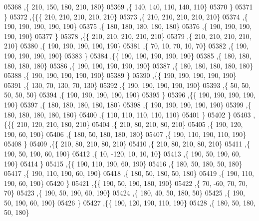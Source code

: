 \begin{DoxyCode}
05368     ,\{   210,   150,   180,   210,   180\}
05369     ,\{   140,   140,   110,   140,   110\}
05370     \}
05371    \}
05372   ,\{\{\{   210,   210,   210,   210,   210\}
05373     ,\{   210,   210,   210,   210,   210\}
05374     ,\{   190,   190,   190,   190,   190\}
05375     ,\{   180,   180,   180,   180,   180\}
05376     ,\{   190,   190,   190,   190,   190\}
05377     \}
05378    ,\{\{   210,   210,   210,   210,   210\}
05379     ,\{   210,   210,   210,   210,   210\}
05380     ,\{   190,   190,   190,   190,   190\}
05381     ,\{    70,    10,    70,    10,    70\}
05382     ,\{   190,   190,   190,   190,   190\}
05383     \}
05384    ,\{\{   190,   190,   190,   190,   190\}
05385     ,\{   180,   180,   180,   180,   180\}
05386     ,\{   190,   190,   190,   190,   190\}
05387     ,\{   180,   180,   180,   180,   180\}
05388     ,\{   190,   190,   190,   190,   190\}
05389     \}
05390    ,\{\{   190,   190,   190,   190,   190\}
05391     ,\{   130,    70,   130,    70,   130\}
05392     ,\{   190,   190,   190,   190,   190\}
05393     ,\{    50,    50,    50,    50,    50\}
05394     ,\{   190,   190,   190,   190,   190\}
05395     \}
05396    ,\{\{   190,   190,   190,   190,   190\}
05397     ,\{   180,   180,   180,   180,   180\}
05398     ,\{   190,   190,   190,   190,   190\}
05399     ,\{   180,   180,   180,   180,   180\}
05400     ,\{   110,   110,   110,   110,   110\}
05401     \}
05402    \}
05403   ,\{\{\{   210,   120,   210,   180,   210\}
05404     ,\{   210,    80,   210,    80,   210\}
05405     ,\{   190,   120,   190,    60,   190\}
05406     ,\{   180,    50,   180,   180,   180\}
05407     ,\{   190,   110,   190,   110,   190\}
05408     \}
05409    ,\{\{   210,    80,   210,    80,   210\}
05410     ,\{   210,    80,   210,    80,   210\}
05411     ,\{   190,    50,   190,    60,   190\}
05412     ,\{    10,  -120,    10,    10,    10\}
05413     ,\{   190,    50,   190,    60,   190\}
05414     \}
05415    ,\{\{   190,   110,   190,    60,   190\}
05416     ,\{   180,    50,   180,    50,   180\}
05417     ,\{   190,   110,   190,    60,   190\}
05418     ,\{   180,    50,   180,    50,   180\}
05419     ,\{   190,   110,   190,    60,   190\}
05420     \}
05421    ,\{\{   190,    50,   190,   180,   190\}
05422     ,\{    70,   -60,    70,    70,    70\}
05423     ,\{   190,    50,   190,    60,   190\}
05424     ,\{   180,    40,    50,   180,    50\}
05425     ,\{   190,    50,   190,    60,   190\}
05426     \}
05427    ,\{\{   190,   120,   190,   110,   190\}
05428     ,\{   180,    50,   180,    50,   180\}

\end{DoxyCode}
